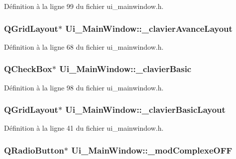 \-Définition à la ligne 99 du fichier ui\-\_\-mainwindow.\-h.

\hypertarget{class_ui___main_window_ab1a8b1e5dea7cdd088cef57264356e0b}{
\subsubsection[{\-\_\-clavier\-Avance\-Layout}]{\setlength{\rightskip}{0pt plus 5cm}\-Q\-Grid\-Layout$\ast$ {\bf \-Ui\-\_\-\-Main\-Window\-::\-\_\-clavier\-Avance\-Layout}}}\label{class_ui___main_window_ab1a8b1e5dea7cdd088cef57264356e0b}


\-Définition à la ligne 68 du fichier ui\-\_\-mainwindow.\-h.

\hypertarget{class_ui___main_window_aface0fc9ed198a25292a75ce279e02c8}{
\subsubsection[{\-\_\-clavier\-Basic}]{\setlength{\rightskip}{0pt plus 5cm}\-Q\-Check\-Box$\ast$ {\bf \-Ui\-\_\-\-Main\-Window\-::\-\_\-clavier\-Basic}}}\label{class_ui___main_window_aface0fc9ed198a25292a75ce279e02c8}


\-Définition à la ligne 98 du fichier ui\-\_\-mainwindow.\-h.

\hypertarget{class_ui___main_window_a7ccbf939ae6d5a0f57068259787f0f9f}{
\subsubsection[{\-\_\-clavier\-Basic\-Layout}]{\setlength{\rightskip}{0pt plus 5cm}\-Q\-Grid\-Layout$\ast$ {\bf \-Ui\-\_\-\-Main\-Window\-::\-\_\-clavier\-Basic\-Layout}}}\label{class_ui___main_window_a7ccbf939ae6d5a0f57068259787f0f9f}


\-Définition à la ligne 41 du fichier ui\-\_\-mainwindow.\-h.

\hypertarget{class_ui___main_window_a1da65de8d4c3c8d5bbf78b0e7796cacf}{
\subsubsection[{\-\_\-mod\-Complexe\-O\-F\-F}]{\setlength{\rightskip}{0pt plus 5cm}\-Q\-Radio\-Button$\ast$ {\bf \-Ui\-\_\-\-Main\-Window\-::\-\_\-mod\-Complexe\-O\-F\-F}}}\label{class_ui___main_window_a1da65de8d4c3c8d5bbf78b0e7796cacf}


